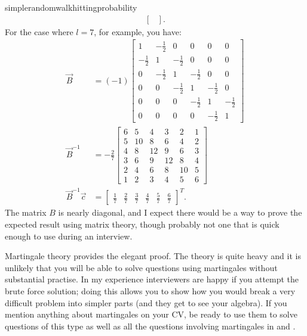 \begin{answer}{simplerandomwalkhittingprobability}
\begin{align*}
\begin{bmatrix}
  \end{bmatrix}
\text{.}
\end{align*}
For the case where $l=7$, for example, you have:
\begin{align*}
\vec{B} &=
(-1)
\left[\begin{matrix}1 & - \frac{1}{2} & 0 & 0 & 0 & 0\\- \frac{1}{2} & 1 & - \frac{1}{2} & 0 & 0 & 0\\0 & - \frac{1}{2} & 1 & - \frac{1}{2} & 0 & 0\\0 & 0 & - \frac{1}{2} & 1 & - \frac{1}{2} & 0\\0 & 0 & 0 & - \frac{1}{2} & 1 & - \frac{1}{2}\\0 & 0 & 0 & 0 & - \frac{1}{2} & 1\end{matrix}\right]
\\
\vec{B}^{-1} &=
-
\frac{2}{7}
\left[\begin{matrix}6 & 5 & 4 & 3 & 2 & 1\\5 & 10 & 8 & 6 & 4 & 2\\4 & 8 & 12 & 9 & 6 & 3\\3 & 6 & 9 & 12 & 8 & 4\\2 & 4 & 6 & 8 & 10 & 5\\1 & 2 & 3 & 4 & 5 & 6\end{matrix}\right]
\\
\vec{B}^{-1}\vec{c}
&=
\left[\begin{matrix}\frac{1}{7} & \frac{2}{7} & \frac{3}{7} & \frac{4}{7} & \frac{5}{7} & \frac{6}{7}\end{matrix}\right]^{T}
\text{.}
\end{align*}
The matrix $B$ is nearly diagonal, and I expect there would be a way to prove the expected result using matrix theory, though probably not one that is quick enough to use during an interview.

Martingale theory provides the elegant proof.
The theory is quite heavy and it is unlikely that you will be able to solve questions using martingales without substantial practise.
In my experience interviewers are happy if you attempt the brute force solution; doing this allows you to show how you would break a very difficult problem into simpler parts (and they get to see your algebra).
If you mention anything about martingales on your CV, be ready to use them to solve questions of this type as well as all the questions involving martingales in \citet{JoshiQA} and \citet{HeardOnTheStreet}.


\end{answer}
